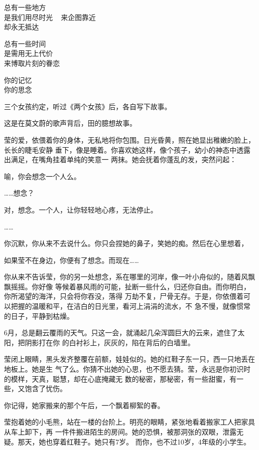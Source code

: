 		总有一些地方 \\
		是我们用尽时光 ~ 来企图靠近 \\
		却永无抵达

		总有一些时间 \\
		是需用无上代价 \\
		来博取片刻的眷恋

		你的记忆 \\
		你的思念

	\endlongpoem
	\endwriting



		三个女孩约定，听过《两个女孩》后，各自写下故事。

		这是在莫文蔚的歌声背后，田的臆想故事。

		\vspace{1em}
		莹的爱，依偎着你的身体，无私地将你包围。日光昏黄，照在她显出稚嫩的脸上，长长的睫毛安静
	垂下，像是睡着。你喜欢她这样，像个孩子，幼小的神态中透露出满足，在嘴角挂着单纯的笑意一
	两抹。她会抚着你蓬乱的发，突然问起：

		喻，你会想念一个人么。

		……想念？

		对，想念。一个人，让你轻轻地心疼，无法停止。

		……

		你沉默，你从来不去说什么。你只会捏她的鼻子，笑她的痴。然后在心里想着，


		如果莹不在身边，你便有了想念。而现在……


		你从来不告诉莹，你的另一处想念，系在哪里的河岸，像一叶小舟似的，随着风飘飘摇摇。你好像
	等候着暴风雨的可能，扯断一些什么，归还你自由。而你明白，你所渴望的海洋，只会将你吞没，落得
	万劫不复，尸骨无存。于是，你依偎着可以把握的温暖和平，在洁白的日光里，看河上涓涓的流水，不
	急不慢，就像惯常的日子，平静到枯燥。


		6月，总是翻云覆雨的天气。只这一会，就涌起几朵浑圆巨大的云来，遮住了太阳，把阴影打在你
	的白衬衫上，灰灰的，陷在背后的白墙里。

		莹闭上眼睛，黑头发齐整覆在前额，娃娃似的。她的红鞋子东一只，西一只地丢在地板上。她是生
	气了么。你猜不出她的心思，也不愿去猜。莹，永远是你初识时的模样，天真，聪慧，却在心底掩藏无
	数的秘密，那秘密，有一些甜蜜，有一些，又饱含了忧伤。


		你记得，她家搬来的那个午后，一个飘着柳絮的春。


		莹抱着她的小毛熊，站在一楼的台阶上。明亮的眼睛，紧张地看着搬家工人把家具从车上卸下，再
	一件件搬进陌生的房间。她的恐惧，被那洞张的双眼，泄露无疑。那天，她也穿着红鞋子。她只有7岁。
	而你，也不过10岁，4年级的小学生。

